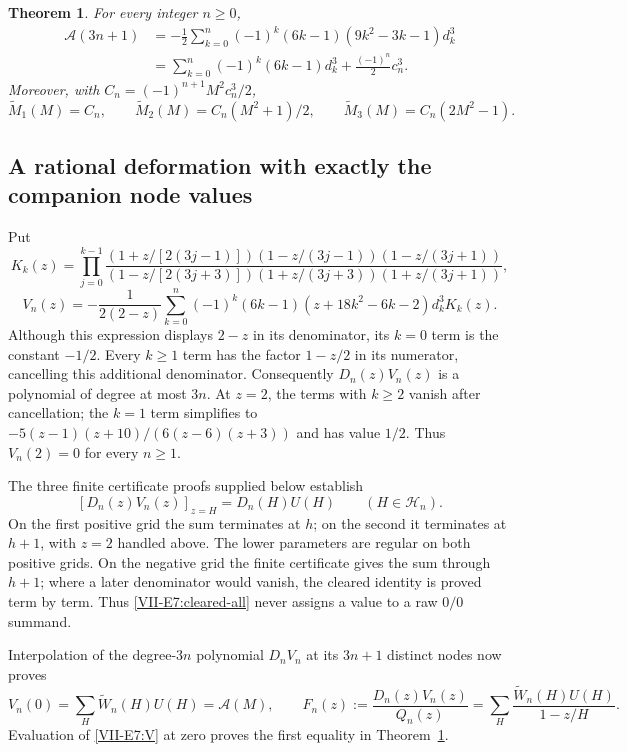 \documentclass[11pt,letterpaper]{article}
\newtheorem{theorem}{Theorem}[section]
\numberwithin{equation}{section}
\begin{document}
\begin{theorem}\label{VII-E7:companion-exact}
For every integer $n\ge0$,
\begin{align*}
 \mathcal A(3n+1)
 &=-\frac12\sum_{k=0}^n(-1)^k(6k-1)(9k^2-3k-1)d_k^3\\
 &=\sum_{k=0}^n(-1)^k(6k-1)d_k^3+\frac{(-1)^n}{2}c_n^3.
\end{align*}
Moreover, with $C_n=(-1)^{n+1}M^2c_n^3/2$,
\[
 \widetilde M_1(M)=C_n,\qquad
 \widetilde M_2(M)=C_n(M^2+1)/2,\qquad
 \widetilde M_3(M)=C_n(2M^2-1).
\]
\end{theorem}

\subsection{A rational deformation with exactly the companion node values}
Put
\[
 K_k(z)=\prod_{j=0}^{k-1}
 \frac{(1+z/[2(3j-1)])(1-z/(3j-1))(1-z/(3j+1))}
 {(1-z/[2(3j+3)])(1+z/(3j+3))(1+z/(3j+1))},
\]
\begin{equation}\label{VII-E7:V}
 V_n(z)=-\frac1{2(2-z)}\sum_{k=0}^n
 (-1)^k(6k-1)(z+18k^2-6k-2)d_k^3K_k(z).
\end{equation}
Although this expression displays $2-z$ in its denominator, its
$k=0$ term is the constant $-1/2$. Every $k\ge1$ term has the
factor $1-z/2$ in its numerator, cancelling this additional denominator.
Consequently $D_n(z)V_n(z)$ is a polynomial of degree at most $3n$.
At $z=2$, the terms with $k\ge2$ vanish after cancellation; the $k=1$
term simplifies to $-5(z-1)(z+10)/(6(z-6)(z+3))$ and has value $1/2$.
Thus $V_n(2)=0$ for every $n\ge1$.

The three finite certificate proofs supplied below establish
\begin{equation}\label{VII-E7:cleared-all}
 [D_n(z)V_n(z)]_{z=H}=D_n(H)U(H)
 \qquad(H\in\mathcal H_n).
\end{equation}
On the first positive grid the sum terminates at $h$; on the second
it terminates at $h+1$, with $z=2$ handled above. The lower parameters
are regular on both positive grids. On the negative grid the finite
certificate gives the sum through $h+1$; where a later denominator
would vanish, the cleared identity is proved term by term. Thus
\eqref{VII-E7:cleared-all} never assigns a value to a raw $0/0$ summand.

Interpolation of the degree-$3n$ polynomial $D_nV_n$ at its $3n+1$
distinct nodes now proves
\[
 V_n(0)=\sum_H\widetilde W_n(H)U(H)=\mathcal A(M),\qquad
 F_n(z):=\frac{D_n(z)V_n(z)}{Q_n(z)}
 =\sum_H\frac{\widetilde W_n(H)U(H)}{1-z/H}.
\]
Evaluation of \eqref{VII-E7:V} at zero proves the first equality in
Theorem~\ref{VII-E7:companion-exact}.
\end{document}
